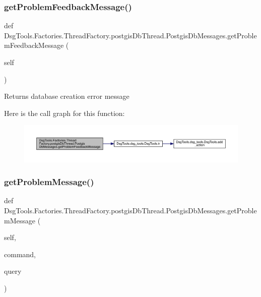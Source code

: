 \subsubsection{\texorpdfstring{get\+Problem\+Feedback\+Message()}{getProblemFeedbackMessage()}}
{\footnotesize\ttfamily def Dsg\+Tools.\+Factories.\+Thread\+Factory.\+postgis\+Db\+Thread.\+Postgis\+Db\+Messages.\+get\+Problem\+Feedback\+Message (\begin{DoxyParamCaption}\item[{}]{self }\end{DoxyParamCaption})}

\begin{DoxyVerb}Returns database creation error message
\end{DoxyVerb}
 Here is the call graph for this function\+:
\nopagebreak
\begin{figure}[H]
\begin{center}
\leavevmode
\includegraphics[width=350pt]{class_dsg_tools_1_1_factories_1_1_thread_factory_1_1postgis_db_thread_1_1_postgis_db_messages_a4e008f1baa39a7252c2ef2b030cdd367_cgraph}
\end{center}
\end{figure}
\mbox{\label{class_dsg_tools_1_1_factories_1_1_thread_factory_1_1postgis_db_thread_1_1_postgis_db_messages_a1aa75f57927e9ab853c8e6a82d455068}} 
\subsubsection{\texorpdfstring{get\+Problem\+Message()}{getProblemMessage()}}
{\footnotesize\ttfamily def Dsg\+Tools.\+Factories.\+Thread\+Factory.\+postgis\+Db\+Thread.\+Postgis\+Db\+Messages.\+get\+Problem\+Message (\begin{DoxyParamCaption}\item[{}]{self,  }\item[{}]{command,  }\item[{}]{query }\end{DoxyParamCaption})}

